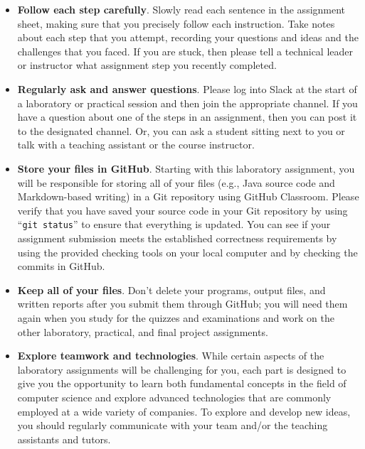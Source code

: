 \documentclass[11pt]{article}
\newcommand{\command}[1]{``\lstinline{#1}''}
\begin{document}
\begin{itemize}
  \setlength{\itemsep}{0pt}

\item {\bf Follow each step carefully}. Slowly read each sentence in the
  assignment sheet, making sure that you precisely follow each instruction. Take
  notes about each step that you attempt, recording your questions and ideas and
  the challenges that you faced. If you are stuck, then please tell a technical
  leader or instructor what assignment step you recently completed.

\item {\bf Regularly ask and answer questions}. Please log into Slack at the
  start of a laboratory or practical session and then join the appropriate
  channel. If you have a question about one of the steps in an assignment, then
  you can post it to the designated channel. Or, you can ask a student sitting
  next to you or talk with a teaching assistant or the course instructor.

\item {\bf Store your files in GitHub}. Starting with this laboratory
  assignment, you will be responsible for storing all of your files (e.g., Java
  source code and Markdown-based writing) in a Git repository using GitHub
  Classroom. Please verify that you have saved your source code in your Git
  repository by using \command{git status} to ensure that everything is
  updated. You can see if your assignment submission meets the established
  correctness requirements by using the provided checking tools on your local
  computer and by checking the commits in GitHub.

\item {\bf Keep all of your files}. Don't delete your programs, output files,
  and written reports after you submit them through GitHub; you will need them
  again when you study for the quizzes and examinations and work on the other
  laboratory, practical, and final project assignments.

\item {\bf Explore teamwork and technologies}. While certain aspects of the
  laboratory assignments will be challenging for you, each part is designed to
  give you the opportunity to learn both fundamental concepts in the field of
  computer science and explore advanced technologies that are commonly employed
  at a wide variety of companies. To explore and develop new ideas, you should
  regularly communicate with your team and/or the teaching assistants and
  tutors.


\end{itemize}
\end{document}
